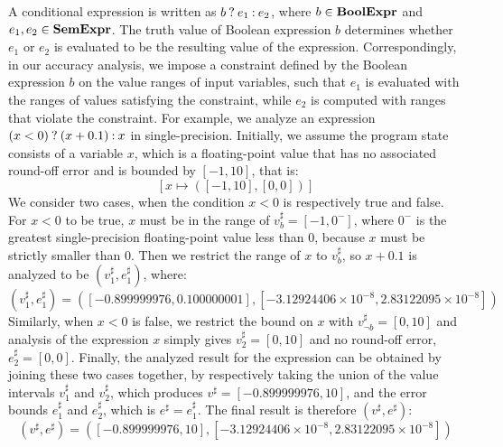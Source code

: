 A conditional expression is written as $b\mathbin{?} e_1\mathbin{:} e_2$, where $b
\in \mathbf{BoolExpr}$ and $e_1, e_2 \in \mathbf{SemExpr}$.  The truth value of Boolean
expression $b$ determines whether $e_1$ or $e_2$ is evaluated to be the
resulting value of the expression.  Correspondingly, in our accuracy analysis,
we impose a constraint defined by the Boolean expression $b$ on the value
ranges of input variables, such that $e_1$ is evaluated with the ranges of
values satisfying the constraint, while $e_2$ is computed with ranges that
violate the constraint.  For example, we analyze an expression $(x
< 0)\mathbin{?}(x + 0.1)\mathbin{:} x$ in single-precision.  Initially, we assume the program
state consists of a variable $x$, which is a floating-point value that has no
associated round-off error and is bounded by $[-1, 10]$, that is:
\begin{equation}
    \left[ x \mapsto \left( [-1, 10], [0, 0] \right) \right]
\end{equation}
We consider two cases, when the condition $x < 0$ is respectively true and
false.  For $x < 0$ to be true, $x$ must be in the range of $v^\sharp_b = [-1,
0^{-}]$, where $0^{-}$ is the greatest single-precision floating-point value
less than 0, because $x$ must be strictly smaller than $0$.  Then we restrict
the range of $x$ to $v^\sharp_b$, so $x + 0.1$ is analyzed to be $(v^\sharp_1,
e^\sharp_1)$, where:
\begin{equation}
    ( v^\sharp_1, e^\sharp_1 ) = (
        [-0.899999976, 0.100000001],
        [-3.12924406 \times 10^{-8}, 2.83122095 \times 10^{-8}]
    )
\end{equation}
Similarly, when $x < 0$ is false, we restrict the bound on $x$ with
$v^\sharp_{\neg b} = [0, 10]$ and analysis of the expression $x$ simply gives
$v^\sharp_2 = [0, 10]$ and no round-off error, $e^\sharp_2 = [0, 0]$.  Finally,
the analyzed result for the expression can be obtained by joining these two
cases together, by respectively taking the union of the value intervals
$v^\sharp_1$ and $v^\sharp_2$, which produces $v^\sharp = [-0.899999976, 10]$,
and the error bounds $e^\sharp_1$ and $e^\sharp_2$, which is $e^\sharp =
e^\sharp_1$.  The final result is therefore $(v^\sharp, e^\sharp)$:
\begin{equation}
    ( v^\sharp, e^\sharp ) = (
        [-0.899999976, 10],
        [-3.12924406 \times 10^{-8}, 2.83122095 \times 10^{-8}]
    )
\end{equation}

